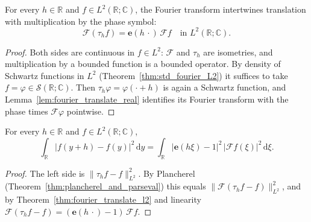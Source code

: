 \begin{theorem}\label{thm:fourier_translate_l2}
\leanok
For every $h \in \mathbb{R}$ and $f \in L^2(\mathbb{R}; \mathbb{C})$, the Fourier transform intertwines translation with multiplication by the phase symbol:
\[
  \mathcal{F}(\tau_h f) = \mathbf{e}(h \,\cdot)\, \mathcal{F} f \quad \text{in } L^2(\mathbb{R}; \mathbb{C}).
\]
\end{theorem}

\begin{proof}
\leanok
Both sides are continuous in $f \in L^2$: $\mathcal{F}$ and $\tau_h$ are isometries, and multiplication by a bounded function is a bounded operator. By density of Schwartz functions in $L^2$ (Theorem~\ref{thm:std_fourier_L2}) it suffices to take $f = \varphi \in \mathcal{S}(\mathbb{R}; \mathbb{C})$. Then $\tau_h \varphi = \varphi(\cdot + h)$ is again a Schwartz function, and Lemma~\ref{lem:fourier_translate_real} identifies its Fourier transform with the phase times $\mathcal{F}\varphi$ pointwise.
\end{proof}

\begin{theorem}\label{thm:translation_modulus_fourier}
\leanok
For every $h \in \mathbb{R}$ and $f \in L^2(\mathbb{R}; \mathbb{C})$,
\[
  \int_{\mathbb{R}} \bigl\lvert f(y + h) - f(y) \bigr\rvert^2 \, \mathrm{d}y
  = \int_{\mathbb{R}} \bigl\lvert \mathbf{e}(h \xi) - 1 \bigr\rvert^2 \, \lvert \mathcal{F} f(\xi) \rvert^2 \, \mathrm{d}\xi.
\]
\end{theorem}

\begin{proof}
\leanok
The left side is $\lVert \tau_h f - f \rVert_{L^2}^2$. By Plancherel (Theorem~\ref{thm:plancherel_and_parseval}) this equals $\lVert \mathcal{F}(\tau_h f - f) \rVert_{L^2}^2$, and by Theorem~\ref{thm:fourier_translate_l2} and linearity $\mathcal{F}(\tau_h f - f) = (\mathbf{e}(h \,\cdot) - 1)\, \mathcal{F} f$.
\end{proof}
